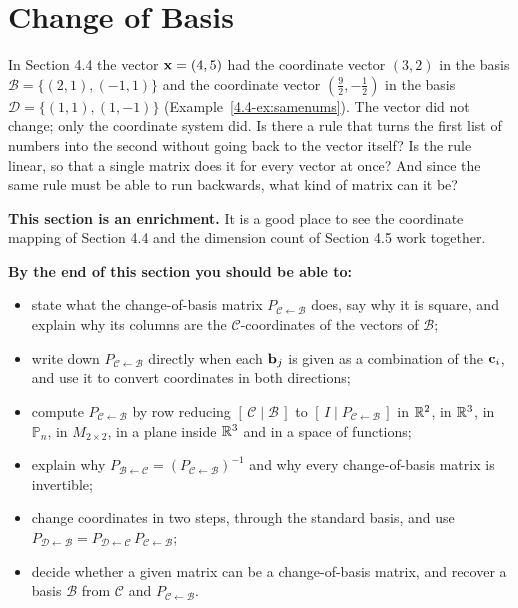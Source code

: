 \documentclass[11pt]{article}
\begin{document}
\section{Change of Basis}

\begin{guide}
In Section 4.4 the vector $\mathbf{x}=(4,5)$ had the coordinate vector $(3,2)$ in the basis $\mathcal{B}=\{(2,1),(-1,1)\}$ and the coordinate vector $(\tfrac92,-\tfrac12)$ in the basis $\mathcal{D}=\{(1,1),(1,-1)\}$ (Example~\ref{4.4-ex:samenums}). The vector did not change; only the coordinate system did. Is there a rule that turns the first list of numbers into the second without going back to the vector itself? Is the rule linear, so that a single matrix does it for every vector at once? And since the same rule must be able to run backwards, what kind of matrix can it be?
\end{guide}

\textbf{This section is an enrichment.} It is a good place to see the coordinate mapping of Section 4.4 and the dimension count of Section 4.5 work together.

\textbf{By the end of this section you should be able to:}
\begin{itemize}
  \item state what the change-of-basis matrix $P_{\mathcal{C}\leftarrow\mathcal{B}}$ does, say why it is square, and explain why its columns are the $\mathcal{C}$-coordinates of the vectors of $\mathcal{B}$;
  \item write down $P_{\mathcal{C}\leftarrow\mathcal{B}}$ directly when each $\mathbf{b}_j$ is given as a combination of the $\mathbf{c}_i$, and use it to convert coordinates in both directions;
  \item compute $P_{\mathcal{C}\leftarrow\mathcal{B}}$ by row reducing $[\,\mathcal{C}\mid\mathcal{B}\,]$ to $[\,I\mid P_{\mathcal{C}\leftarrow\mathcal{B}}\,]$ in $\mathbb{R}^2$, in $\mathbb{R}^3$, in $\mathbb{P}_n$, in $M_{2\times2}$, in a plane inside $\mathbb{R}^3$ and in a space of functions;
  \item explain why $P_{\mathcal{B}\leftarrow\mathcal{C}}=\left(P_{\mathcal{C}\leftarrow\mathcal{B}}\right)^{-1}$ and why every change-of-basis matrix is invertible;
  \item change coordinates in two steps, through the standard basis, and use $P_{\mathcal{D}\leftarrow\mathcal{B}}=P_{\mathcal{D}\leftarrow\mathcal{C}}\,P_{\mathcal{C}\leftarrow\mathcal{B}}$;
  \item decide whether a given matrix can be a change-of-basis matrix, and recover a basis $\mathcal{B}$ from $\mathcal{C}$ and $P_{\mathcal{C}\leftarrow\mathcal{B}}$.
\end{itemize}
\end{document}
